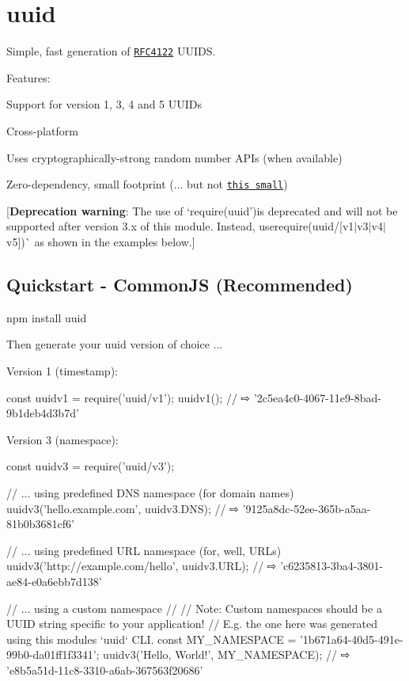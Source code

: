 \section*{uuid \href{http://travis-ci.org/kelektiv/node-uuid}{\tt }}

Simple, fast generation of \href{http://www.ietf.org/rfc/rfc4122.txt}{\tt R\+F\+C4122} U\+U\+I\+DS.

Features\+:


\begin{DoxyItemize}
\item Support for version 1, 3, 4 and 5 U\+U\+I\+Ds
\item Cross-\/platform
\item Uses cryptographically-\/strong random number A\+P\+Is (when available)
\item Zero-\/dependency, small footprint (... but not \href{https://gist.github.com/982883}{\tt this small})
\end{DoxyItemize}

\mbox{[}{\bfseries Deprecation warning}\+: The use of `require(\textquotesingle{}uuid'){\ttfamily is deprecated and will not be supported after version 3.\+x of this module. Instead, use}require(\textquotesingle{}uuid/\mbox{[}v1$\vert$v3$\vert$v4$\vert$v5\mbox{]}\textquotesingle{})\`{} as shown in the examples below.\mbox{]}

\subsection*{Quickstart -\/ Common\+JS (Recommended)}


\begin{DoxyCode}
npm install uuid
\end{DoxyCode}


Then generate your uuid version of choice ...

Version 1 (timestamp)\+:


\begin{DoxyCode}
const uuidv1 = require('uuid/v1');
uuidv1(); // ⇨ '2c5ea4c0-4067-11e9-8bad-9b1deb4d3b7d'
\end{DoxyCode}


Version 3 (namespace)\+:


\begin{DoxyCode}
const uuidv3 = require('uuid/v3');

// ... using predefined DNS namespace (for domain names)
uuidv3('hello.example.com', uuidv3.DNS); // ⇨ '9125a8dc-52ee-365b-a5aa-81b0b3681cf6'

// ... using predefined URL namespace (for, well, URLs)
uuidv3('http://example.com/hello', uuidv3.URL); // ⇨ 'c6235813-3ba4-3801-ae84-e0a6ebb7d138'

// ... using a custom namespace
//
// Note: Custom namespaces should be a UUID string specific to your application!
// E.g. the one here was generated using this modules `uuid` CLI.
const MY\_NAMESPACE = '1b671a64-40d5-491e-99b0-da01ff1f3341';
uuidv3('Hello, World!', MY\_NAMESPACE); // ⇨ 'e8b5a51d-11c8-3310-a6ab-367563f20686'
\end{DoxyCode}


